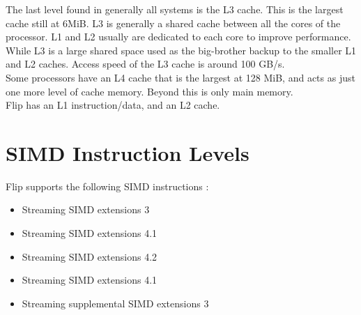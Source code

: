 \documentclass[letterpaper,10pt,titlepage]{article}
\begin{document}
    The last level found in generally all systems is the L3 cache. This is the largest cache still at 6MiB. 
    L3 is generally a shared cache between all the cores of the processor. L1 and L2 usually are dedicated to each 
    core to improve performance. While L3 is a large shared space used as the big-brother backup to the smaller
    L1 and L2 caches. Access speed of the L3 cache is around 100 GB/s. \\
    
    Some processors have an L4 cache that is the largest at 128 MiB, and acts as just one more level of cache 
    memory. Beyond this is only main memory. \\
    
    Flip has an L1 instruction/data, and an L2 cache. \\
\pagebreak

\section{SIMD Instruction Levels}

    
    Flip supports the following SIMD instructions :\\
    \begin{itemize}
        \item Streaming SIMD extensions 3
        \item Streaming SIMD extensions 4.1
        \item Streaming SIMD extensions 4.2
        \item Streaming SIMD extensions 4.1
        \item Streaming supplemental SIMD extensions 3
    \end{itemize}
\pagebreak
\end{document}
